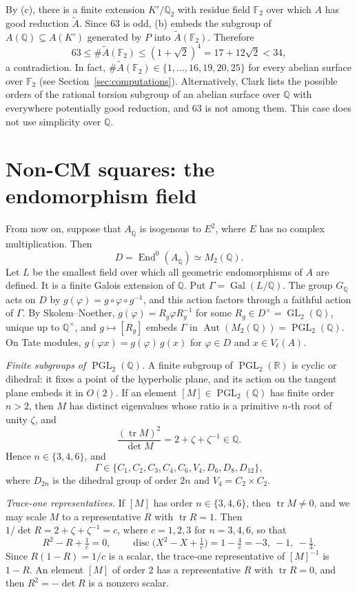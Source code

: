 \documentclass[11pt]{article}
\newcommand{\Q}{\mathbb Q}
\newcommand{\F}{\mathbb F}
\DeclareMathOperator{\End}{End}
\DeclareMathOperator{\Gal}{Gal}
\DeclareMathOperator{\GL}{GL}
\DeclareMathOperator{\PGL}{PGL}
\begin{document}
By (c), there is a finite extension \(K'/\Q_2\) with residue field
\(\F_2\) over which \(A\) has good reduction \(\widetilde A\). Since
\(63\) is odd, (b) embeds the subgroup of \(A(\Q)\subseteq A(K')\)
generated by \(P\) into \(\widetilde A(\F_2)\). Therefore
\[
 63\leq\#\widetilde A(\F_2)\leq(1+\sqrt2)^4=17+12\sqrt2<34,
\]
a contradiction. In fact,
\(\#\widetilde A(\F_2)\in\{1,\dots,16,19,20,25\}\) for every abelian surface
over \(\F_2\) (see Section~\ref{sec:computations}).
Alternatively, Clark \cite[Theorem 5]{Clark} lists the possible orders
of the rational torsion subgroup of an abelian surface over \(\Q\) with
everywhere potentially good reduction, and \(63\) is not among them.
This case does not use simplicity over \(\Q\).

\section{Non-CM squares: the endomorphism field}\label{sec:endomorphism-field}

From now on, suppose that \(A_{\overline{\Q}}\) is isogenous to \(E^2\),
where \(E\) has no complex multiplication. Then
\[
 D=\End^0(A_{\overline{\Q}})\simeq M_2(\Q).
\]
Let \(L\) be the smallest field over which all geometric endomorphisms
of \(A\) are defined. It is a finite Galois extension of \(\Q\). Put
\(\Gamma=\Gal(L/\Q)\). The group \(G_{\Q}\) acts on \(D\) by
\(g(\varphi)=g\circ\varphi\circ g^{-1}\), and this action factors
through a faithful action of \(\Gamma\). By Skolem--Noether,
\(g(\varphi)=R_g\varphi R_g^{-1}\) for some
\(R_g\in D^\times=\GL_2(\Q)\), unique up to \(\Q^\times\), and
\(g\mapsto[R_g]\) embeds \(\Gamma\) in
\(\operatorname{Aut}(M_2(\Q))=\PGL_2(\Q)\). On Tate modules,
\(g(\varphi x)=g(\varphi)\,g(x)\) for \(\varphi\in D\) and
\(x\in V_\ell(A)\).

\emph{Finite subgroups of \(\PGL_2(\Q)\).} A finite subgroup of
\(\PGL_2(\mathbb R)\) is cyclic or dihedral: it fixes a point of the
hyperbolic plane, and its action on the tangent plane embeds it in
\(O(2)\). If an element \([M]\in\PGL_2(\Q)\) has finite order \(n>2\),
then \(M\) has distinct eigenvalues whose ratio is a primitive \(n\)-th
root of unity \(\zeta\), and
\[
 \frac{(\operatorname{tr}M)^2}{\det M}=2+\zeta+\zeta^{-1}\in\Q .
\]
Hence \(n\in\{3,4,6\}\), and
\[
 \Gamma\in\{C_1,C_2,C_3,C_4,C_6,V_4,D_6,D_8,D_{12}\},
\]
where \(D_{2n}\) is the dihedral group of order \(2n\) and
\(V_4=C_2\times C_2\).

\emph{Trace-one representatives.} If \([M]\) has order
\(n\in\{3,4,6\}\), then \(\operatorname{tr}M\neq0\), and we may scale
\(M\) to a representative \(R\) with \(\operatorname{tr}R=1\). Then
\(1/\det R=2+\zeta+\zeta^{-1}=c\), where \(c=1,2,3\) for \(n=3,4,6\), so
that
\[
 R^2-R+\tfrac1c=0,\qquad
 \operatorname{disc}\bigl(X^2-X+\tfrac1c\bigr)=1-\tfrac4c=-3,\ -1,\ -\tfrac13 .
\]
Since \(R(1-R)=1/c\) is a scalar, the trace-one representative of
\([M]^{-1}\) is \(1-R\). An element \([M]\) of order \(2\) has a
representative \(R\) with \(\operatorname{tr}R=0\), and then
\(R^2=-\det R\) is a nonzero scalar.
\end{document}
